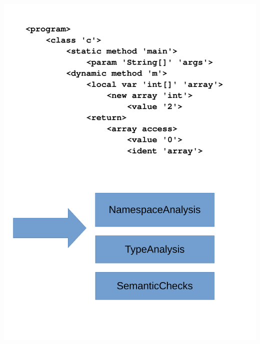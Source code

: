 \documentclass[navbaroff,en]{sdqbeamer}
\begin{document}
\begin{frame}
\begin{columns}
\begin{column}{0.47\textwidth}
		\centering \includegraphics[scale=0.24]{images/semantic_tests.pdf}
\end{column}
\end{columns}

\end{frame}
\end{document}
